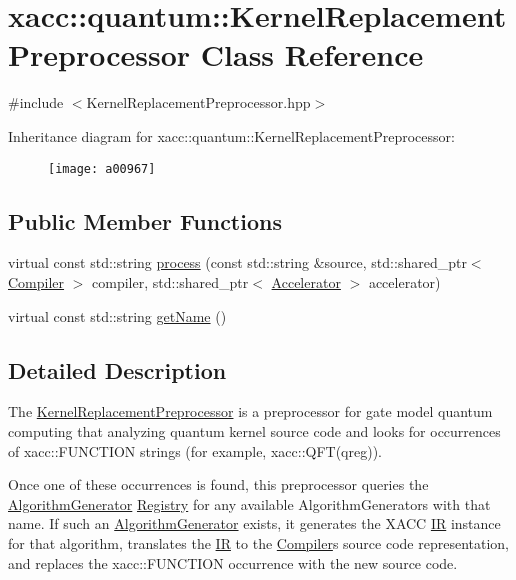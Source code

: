 \hypertarget{a00967}{}\section{xacc\+:\+:quantum\+:\+:Kernel\+Replacement\+Preprocessor Class Reference}
\label{a00967}


{\ttfamily \#include $<$Kernel\+Replacement\+Preprocessor.\+hpp$>$}

Inheritance diagram for xacc\+:\+:quantum\+:\+:Kernel\+Replacement\+Preprocessor\+:\begin{figure}[H]
\begin{center}
\leavevmode
\texttt{[image: a00967]}
\end{center}
\end{figure}
\subsection*{Public Member Functions}
\begin{DoxyCompactItemize}
\item 
virtual const std\+::string \hyperlink{a00967_ad4f9ba1f83ea45ed376f36e3853c668d}{process} (const std\+::string \&source, std\+::shared\+\_\+ptr$<$ \hyperlink{a01103}{Compiler} $>$ compiler, std\+::shared\+\_\+ptr$<$ \hyperlink{a01087}{Accelerator} $>$ accelerator)
\item 
virtual const std\+::string \hyperlink{a00967_af74db6b7f3adeb7d203777f5ce450491}{get\+Name} ()
\end{DoxyCompactItemize}


\subsection{Detailed Description}
The \hyperlink{a00967}{Kernel\+Replacement\+Preprocessor} is a preprocessor for gate model quantum computing that analyzing quantum kernel source code and looks for occurrences of \textquotesingle{}xacc\+::\+F\+U\+N\+C\+T\+I\+ON\textquotesingle{} strings (for example, xacc\+::\+Q\+F\+T(qreg)).

Once one of these occurrences is found, this preprocessor queries the \hyperlink{a01119}{Algorithm\+Generator} \hyperlink{a01199}{Registry} for any available Algorithm\+Generators with that name. If such an \hyperlink{a01119}{Algorithm\+Generator} exists, it generates the X\+A\+CC \hyperlink{a01151}{IR} instance for that algorithm, translates the \hyperlink{a01151}{IR} to the \hyperlink{a01103}{Compiler}\textquotesingle{}s source code representation, and replaces the \textquotesingle{}xacc\+::\+F\+U\+N\+C\+T\+I\+ON\textquotesingle{} occurrence with the new source code. 

